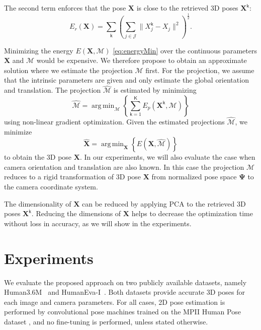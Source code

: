 \documentclass[10pt,journal,compsoc]{IEEEtran}
\newcommand{\nspacet}{\mbox{$\mathbf{\Psi}$}}
\DeclareMathOperator*{\argmin}{arg\,min}
\begin{document}
The second term enforces that the pose $\mathbf{X}$ is close to the retrieved 3D poses $\mathbf{X}^{\mathsf{k}}$:
\begin{equation}
E_{r}(\mathbf{X}) = \sum_{\mathsf{k}} \left( \sum_{j \in \mathcal{J}} \| X^{\mathsf{k}}_{j} - X_j\|^2 \right)^{\frac{1}{2}}.
\label{eq:energyMotion}
\end{equation}

Minimizing the energy $E(\mathbf{X},\mathcal{M})$ \eqref{eq:energyMin} over the continuous parameters $\mathbf{X}$ and $\mathcal{M}$ would be expensive.
We therefore propose to obtain an approximate solution where we estimate the projection $\mathcal{M}$ first.
For the projection, we assume that the intrinsic parameters are given and only estimate the global orientation and translation.
The projection $\hat{\mathcal{M}}$ is estimated by minimizing
\begin{equation}
\hat{\mathcal{M}} = \argmin_{\mathcal{M}} \left\{ \sum_{\mathsf{k}=1}^{\mathsf{K}} E_{p}(\mathbf{X}^{\mathsf{k}},\mathcal{M}) \right\}
\label{eq:projerr1}
\end{equation}
using non-linear gradient optimization. Given the estimated projections $\hat{\mathcal{M}}$, we minimize
\begin{equation}
\hat{\mathbf{X}} = \argmin_{\mathbf{X}} \left\{ E(\mathbf{X},\hat{\mathcal{M}}) \right\}
\label{eq:energyMin2}
\end{equation}
to obtain the 3D pose $\mathbf{X}$. In our experiments, we will also evaluate the case when camera orientation and translation are also known.
In this case the projection $\mathcal{M}$ reduces to a rigid transformation of 3D pose $\mathbf{X}$ from normalized pose space $\nspacet$ 
to the camera coordinate system. 

The dimensionality of $\mathbf{X}$ can be reduced by applying PCA to the retrieved 3D poses $\mathbf{X}^{\mathsf{k}}$.
Reducing the dimensions of $\mathbf{X}$ helps to decrease the optimization time without loss in accuracy, as we will show in the experiments. 


\section{Experiments}\label{sec:exp}
We evaluate the proposed approach on two publicly available datasets, namely  Human3.6M~\cite{h36m_pami} and
HumanEva-I~\cite{Sigal_2010}. Both datasets provide accurate 3D poses for each image and camera parameters.
For all cases, 2D pose estimation is performed by convolutional pose machines \cite{wei2016convolutional} trained 
on the MPII Human Pose dataset \cite{andriluka14cvpr}, and no fine-tuning is performed, unless stated otherwise. 
\end{document}
